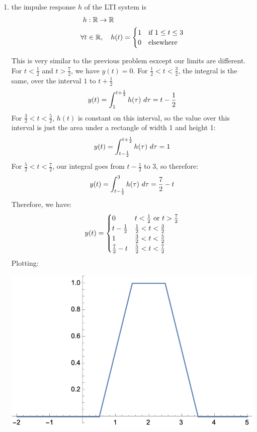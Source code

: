 \documentclass[10pt]{article}
\begin{document}
\begin{enumerate}[label=\alph*)]
\begin{solution}
\begin{center}
				\end{center}
			\end{solution}
		\item the impulse response \( h \) of the LTI system is
			\begin{align*}
				h &: \mathbb R \to \mathbb R\\
				\forall t &\in \mathbb R, \ \ \ h(t) = \begin{cases}
					1 & \text{if \( 1 \le t \le 3 \)}\\
					0 & \text{elsewhere}
				\end{cases}
			\end{align*}

			\begin{solution}
				This is very similar to the previous problem esxcept our limits are different. 
				For \( t < \frac{1}{2} \) and \( t > \frac{7}{2} \), we have \( y(t) = 0 \). For 
				\( \frac{1}{2} < t < \frac{3}{2} \), the integral is the same, over the interval \( 1\) to 
				\( t + \frac{1}{2} \)
				\[
				y(t) = \int_{1}^{t + \frac{1}{2}} h(\tau) \ d \tau = t - \frac{1}{2} 
				\] 
				For \( \frac{3}{2} < t < \frac{5}{2} \), \( h(t) \) is constant on this interval, so the 
				value over this interval is just the area under a rectangle of width 1 and height 1:
				\[
				y(t) = \int_{t-\frac{1}{2}}^{t+\frac{1}{2}} h(\tau)\ d \tau = 1
				\] 
				For \( \frac{5}{2} < t < \frac{7}{2} \), our integral goes from \( t - \frac{1}{2} \) to \( 3 \), 
				so therefore: 
				\[
				y(t) = \int_{t-\frac{1}{2}}^{3} h(\tau)\ d \tau = \frac{7}{2} - t 
				\] 
				Therefore, we have: 
				\[
				y(t) = \begin{cases}
					0 & \text{\( t<\frac{1}{2} \) or \( t > \frac{7}{2} \)}\\
					t - \frac{1}{2} & \frac{1}{2} < t < \frac{3}{2}\\
					1 & \frac{3}{2} < t < \frac{5}{2}\\
					\frac{7}{2} - t & \frac{5}{2} < t < \frac{7}{2}
				\end{cases}
				\] 
				Plotting: 
				\begin{center}
					\includegraphics[scale=0.8]{q5b.png}

\end{center}
\end{solution}
\end{enumerate}
\end{document}
